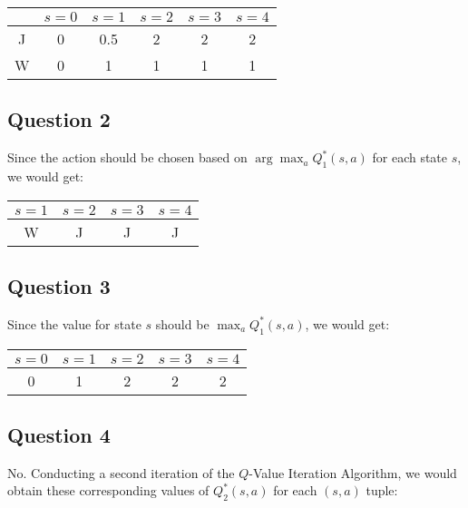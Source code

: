 \documentclass[11pt,fancychapters]{article}
\begin{document}
\begin{table}[h!]
	\centering
	\begin{tabular}{| c | c | c | c | c | c |} 
		\hline
		& $s = 0$ & $s = 1$ & $s = 2$ & $s = 3$ & $s = 4$ \\
		\hline
		J & 0 & 0.5 & 2 & 2 & 2 \\
		\hline
		W & 0 & 1 & 1 & 1 & 1 \\
		\hline
	\end{tabular}
\end{table}

\subsection*{Question 2}

Since the action should be chosen based on $\arg \max_a Q_1^*(s, a)$ for each state $s$, we would get:

\begin{table}[h!]
	\centering
	\begin{tabular}{| c | c | c | c |} 
		\hline
		$s = 1$ & $s = 2$ & $s = 3$ & $s = 4$ \\
		\hline
		W & J & J & J \\
		\hline
	\end{tabular}
\end{table}

\subsection*{Question 3}

Since the value for state $s$ should be $\max_a Q_1^*(s, a)$, we would get:

\begin{table}[h!]
	\centering
	\begin{tabular}{| c | c | c | c | c |} 
		\hline
		$s = 0$ & $s = 1$ & $s = 2$ & $s = 3$ & $s = 4$ \\
		\hline
		0 & 1 & 2 & 2 & 2 \\
		\hline
	\end{tabular}
\end{table}

\subsection*{Question 4}

No. Conducting a second iteration of the $Q$-Value Iteration Algorithm, we would obtain these corresponding values of $Q_2^*(s, a)$ for each $(s, a)$ tuple:
\end{document}

